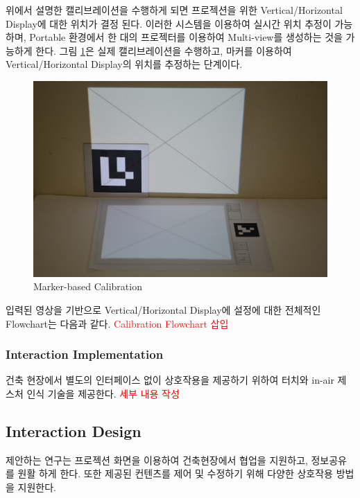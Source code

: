 위에서 설명한 캘리브레이션을 수행하게 되면 프로젝션을 위한 Vertical/Horizontal Display에 대한 위치가 결정 된다. 이러한 시스템을 이용하여 실시간 위치 추정이 가능하며, Portable 환경에서 한 대의 프로젝터를 이용하여 Multi-view를 생성하는 것을 가능하게 한다. 그림 \ref{fig:marker_calibration}은 실제 캘리브레이션을 수행하고, 마커를 이용하여 Vertical/Horizontal Display의 위치를 추정하는 단계이다. 
\begin{figure}[ht!]
	\centering
    \includegraphics[width=\textwidth]{3-System/rectified}
	\caption{Marker-based Calibration}
    \label{fig:marker_calibration}
\end{figure}
입력된 영상을 기반으로 Vertical/Horizontal Display에 설정에 대한 전체적인 Flowchart는 다음과 같다. 
\textcolor{red}{Calibration Flowchart 삽입}

\subsubsection{Interaction Implementation}
건축 현장에서 별도의 인터페이스 없이 상호작용을 제공하기 위하여 터치와 in-air 제스처 인식 기술을 제공한다.
\textcolor{red}{세부 내용 작성}



\subsection{Interaction Design}

제안하는 연구는 프로젝션 화면을 이용하여 건축현장에서 협업을 지원하고, 정보공유를 원활 하게 한다. 또한 제공된 컨텐츠를 제어 및 수정하기 위해 다양한 상호작용 방법을 지원한다. 
